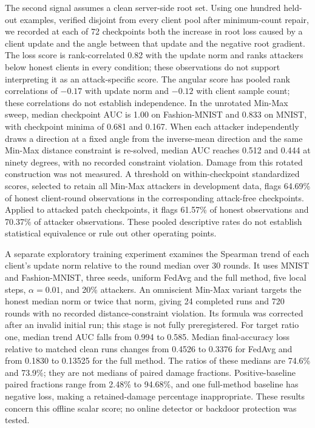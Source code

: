 \documentclass[journal]{IEEEtran}
\begin{document}
The second signal assumes a clean server-side root set. Using one hundred held-out examples, verified disjoint from every client pool after minimum-count repair, we recorded at each of 72 checkpoints both the increase in root loss caused by a client update and the angle between that update and the negative root gradient. The loss score is rank-correlated 0.82 with the update norm and ranks attackers below honest clients in every condition; these observations do not support interpreting it as an attack-specific score. The angular score has pooled rank correlations of $-0.17$ with update norm and $-0.12$ with client sample count; these correlations do not establish independence. In the unrotated Min-Max sweep, median checkpoint AUC is 1.00 on Fashion-MNIST and 0.833 on MNIST, with checkpoint minima of 0.681 and 0.167. When each attacker independently draws a direction at a fixed angle from the inverse-mean direction and the same Min-Max distance constraint is re-solved, median AUC reaches 0.512 and 0.444 at ninety degrees, with no recorded constraint violation. Damage from this rotated construction was not measured. A threshold on within-checkpoint standardized scores, selected to retain all Min-Max attackers in development data, flags 64.69\% of honest client-round observations in the corresponding attack-free checkpoints. Applied to attacked patch checkpoints, it flags 61.57\% of honest observations and 70.37\% of attacker observations. These pooled descriptive rates do not establish statistical equivalence or rule out other operating points.

A separate exploratory training experiment examines the Spearman trend of each client's update norm relative to the round median over 30 rounds. It uses MNIST and Fashion-MNIST, three seeds, uniform FedAvg and the full method, five local steps, $\alpha=0.01$, and 20\% attackers. An omniscient Min-Max variant targets the honest median norm or twice that norm, giving 24 completed runs and 720 rounds with no recorded distance-constraint violation. Its formula was corrected after an invalid initial run; this stage is not fully preregistered. For target ratio one, median trend AUC falls from 0.994 to 0.585. Median final-accuracy loss relative to matched clean runs changes from 0.4526 to 0.3376 for FedAvg and from 0.1830 to 0.13525 for the full method. The ratios of these medians are 74.6\% and 73.9\%; they are not medians of paired damage fractions. Positive-baseline paired fractions range from 2.48\% to 94.68\%, and one full-method baseline has negative loss, making a retained-damage percentage inappropriate. These results concern this offline scalar score; no online detector or backdoor protection was tested.
\end{document}

